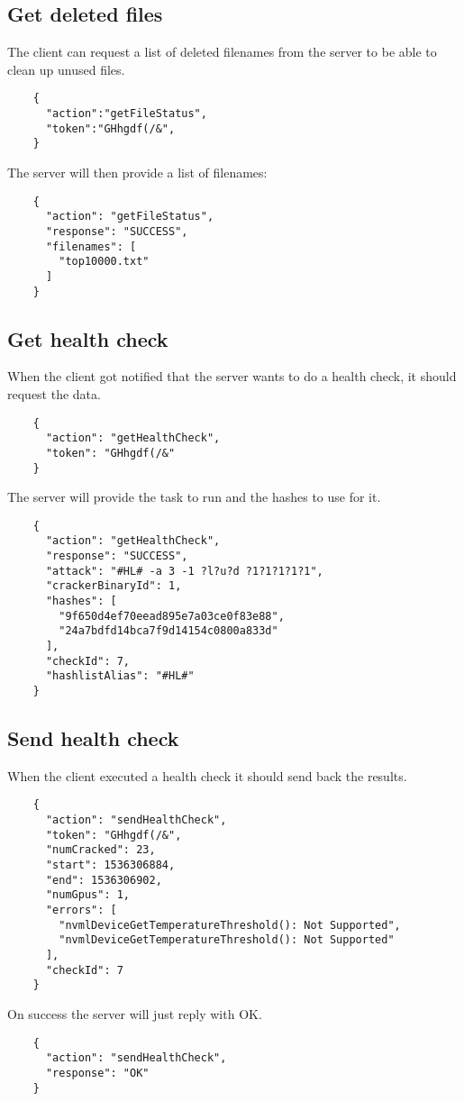 \documentclass{article}
\begin{document}
	\subsection*{Get deleted files}
	The client can request a list of deleted filenames from the server to be able to clean up unused files.
	\begin{verbatim}
	{
	  "action":"getFileStatus",
	  "token":"GHhgdf(/&",
	}
	\end{verbatim}
	The server will then provide a list of filenames:
	\begin{verbatim}
	{
	  "action": "getFileStatus",
	  "response": "SUCCESS",
	  "filenames": [
	    "top10000.txt"
	  ]
	}
	\end{verbatim}
	
	\subsection*{Get health check}
	When the client got notified that the server wants to do a health check, it should request the data.
	\begin{verbatim}
	{
	  "action": "getHealthCheck", 
	  "token": "GHhgdf(/&"
	}
	\end{verbatim}
	The server will provide the task to run and the hashes to use for it.
	\begin{verbatim}
	{
	  "action": "getHealthCheck",
	  "response": "SUCCESS",
	  "attack": "#HL# -a 3 -1 ?l?u?d ?1?1?1?1?1",
	  "crackerBinaryId": 1,
	  "hashes": [
	    "9f650d4ef70eead895e7a03ce0f83e88",
	    "24a7bdfd14bca7f9d14154c0800a833d"
	  ],
	  "checkId": 7,
	  "hashlistAlias": "#HL#"
	}
	\end{verbatim}
	
	\subsection*{Send health check}
	When the client executed a health check it should send back the results.
	\begin{verbatim}
	{
	  "action": "sendHealthCheck", 
	  "token": "GHhgdf(/&", 
	  "numCracked": 23, 
	  "start": 1536306884, 
	  "end": 1536306902, 
	  "numGpus": 1, 
	  "errors": [
	    "nvmlDeviceGetTemperatureThreshold(): Not Supported", 
	    "nvmlDeviceGetTemperatureThreshold(): Not Supported"
	  ], 
	  "checkId": 7
	}
	\end{verbatim}
	On success the server will just reply with OK.
	\begin{verbatim}
	{
	  "action": "sendHealthCheck",
	  "response": "OK"
	}
	\end{verbatim}
	
\end{document}
